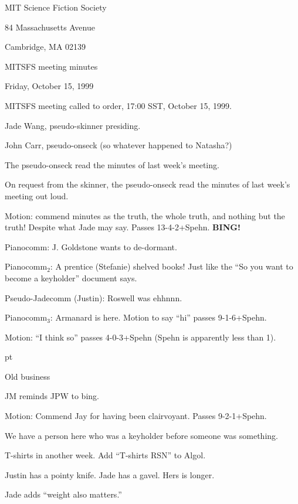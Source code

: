 \documentclass[12pt]{article}
\begin{document}
\begin{center}

MIT Science Fiction Society 

84 Massachusetts Avenue

Cambridge, MA 02139

\vspace{12pt}

MITSFS meeting minutes

Friday, October 15, 1999

\end{center}

\vskip 12pt

MITSFS meeting called to order, 17:00 SST, October 15, 1999.

Jade Wang, pseudo-skinner presiding.

John Carr, pseudo-onseck (so whatever happened to Natasha?)

The pseudo-onseck read the minutes of last week's meeting.

On request from the skinner, the pseudo-onseck read the minutes of last
week's meeting out loud.

Motion: commend minutes as the truth, the whole truth, and nothing but
the truth!  Despite what Jade may say.  Passes 13-4-2+Spehn.  {\bf BING!}

Pianocomm: J. Goldstone wants to de-dormant.

Pianocomm$_2$: A prentice (Stefanie) shelved books!  Just like the
``So you want to become a keyholder'' document says.

Pseudo-Jadecomm (Justin): Roswell was ehhnnn.

Pianocomm$_3$: Armanard is here.  Motion to say ``hi'' passes 9-1-6+Spehn.

Motion: ``I think so'' passes 4-0-3+Spehn (Spehn is apparently less than 1).

 pt

\centerline{Old business}

JM reminds JPW to bing.

Motion: Commend Jay for having been clairvoyant.  Passes 9-2-1+Spehn.

We have a person here who was a keyholder before someone was something.

T-shirts in another week.  Add ``T-shirts RSN'' to Algol.

Justin has a pointy knife.
Jade has a gavel.
Hers is longer.

Jade adds ``weight also matters.''
\end{document}
